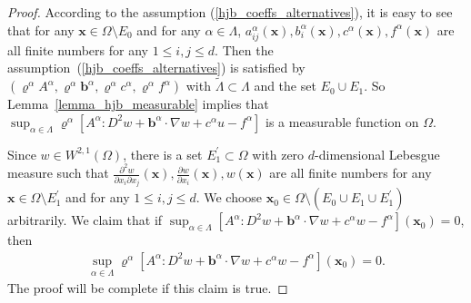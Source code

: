 \documentclass[12pt]{amsart}
\newcommand{\boldx}{\boldsymbol{x}}
\theoremstyle{definition}
\theoremstyle{remark}
\begin{document}
\begin{proof}
According to the assumption (\ref{hjb_coeffs_alternatives}), it is easy to see 
that for any $\boldx \in \Omega \setminus E_{0}$ and for any $\alpha\in\Lambda$, 
$a_{ij}^{\alpha}(\boldx),b_{i}^{\alpha}(\boldx),c^{\alpha}(\boldx), 
f^{\alpha}(\boldx)$ are all finite numbers for any $1\leq i,j \leq d$.
Then the assumption~(\ref{hjb_coeffs_alternatives}) is 
satisfied by $\left(\varrho^{\alpha}A^{\alpha}, \varrho^{\alpha}
\boldsymbol{b}^{\alpha}, \varrho^{\alpha}c^{\alpha}, 
\varrho^{\alpha}f^{\alpha}\right)$ with $\tilde{\Lambda}\subset \Lambda$ 
and the set $E_{0}\cup E_{1}$. 
So Lemma~\ref{lemma_hjb_measurable} implies that 
$\sup_{\alpha\in \Lambda}\varrho^{\alpha}[A^{\alpha}:D^{2}w 
+ \boldsymbol{b}^{\alpha}\cdot \nabla w + c^{\alpha}u - f^{\alpha}]$ 
is a measurable function on $\Omega$.

Since $w \in W^{2,1}(\Omega)$, there is a set $E_{1}^{\prime}\subset 
\Omega$ with zero $d$-dimensional Lebesgue measure such that 
$\frac{\partial^{2}w}{\partial x_{i}\partial x_{j}}(\boldx), 
\frac{\partial w}{\partial x_{i}}(\boldx), w(\boldx)$ are all finite numbers 
for any $\boldx \in \Omega \setminus E_{1}^{\prime}$ and 
for any $1\leq i,j \leq d$.
We choose $\boldx_{0} \in \Omega \setminus (E_{0}\cup E_{1} \cup 
E_{1}^{\prime})$ arbitrarily. We claim that if 
$\sup_{\alpha\in \Lambda}[A^{\alpha}:D^{2}w + \boldsymbol{b}^{\alpha}\cdot \nabla w 
+ c^{\alpha}w - f^{\alpha}](\boldx_{0}) = 0$, then 
\begin{align*}
\sup_{\alpha\in \Lambda} \varrho^{\alpha}[A^{\alpha}:D^{2}w 
+ \boldsymbol{b}^{\alpha}\cdot \nabla w 
+ c^{\alpha}w - f^{\alpha}](\boldx_{0}) = 0.
\end{align*}
The proof will be complete if this claim is true.


\end{proof}
\end{document}
